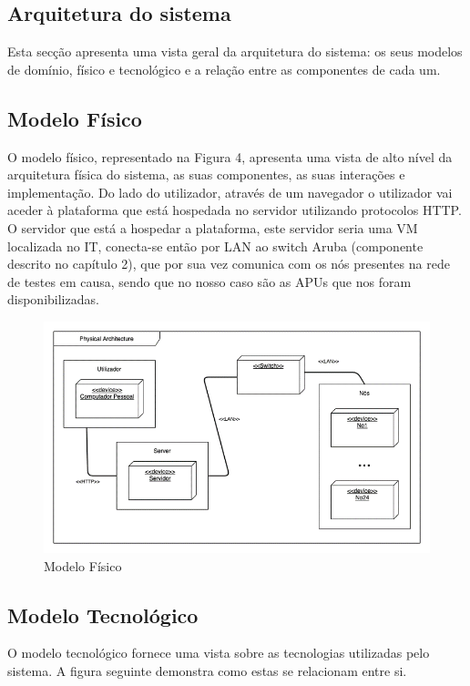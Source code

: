 \subsection{Arquitetura do sistema}
Esta secção apresenta uma vista geral da arquitetura do sistema: os seus modelos de domínio, físico e tecnológico e a relação entre as componentes de cada um.
\subsection{Modelo Físico}
O modelo físico, representado na Figura 4, apresenta uma vista de alto nível da arquitetura física do sistema, as suas componentes, as suas interações e implementação. \newline
Do lado do utilizador, através de um navegador o utilizador vai aceder à plataforma que está hospedada no servidor utilizando protocolos HTTP.\newline
O servidor que está a hospedar a plataforma, este servidor seria uma VM localizada no IT, conecta-se então por LAN ao switch Aruba (componente descrito no capítulo 2), que por sua vez comunica com os nós presentes na rede de testes em causa, sendo que no nosso caso são as APUs que nos foram disponibilizadas.
\begin{figure}[!ht]
    \centering
    \includegraphics[height=0.4\textheight]{images/modeloFisico.png}
    \caption{Modelo Físico}
    \label{fig:fisico}
\end{figure}

\newpage

\subsection{Modelo Tecnológico}
O modelo tecnológico fornece uma vista sobre as tecnologias utilizadas pelo sistema. A figura seguinte demonstra como estas se relacionam entre si.

